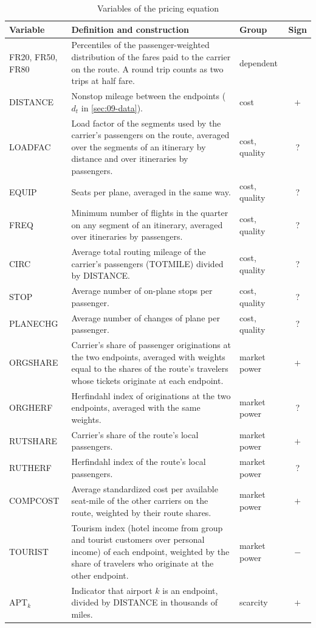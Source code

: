 \begin{table}[htbp]
\centering
\caption{Variables of the pricing equation}
\label{tab:09-bor-vars}
\footnotesize
\renewcommand{\arraystretch}{1.12}
\begin{tabularx}{\linewidth}{@{}l >{\raggedright\arraybackslash}X l c@{}}
\toprule
Variable & Definition and construction & Group & Sign \\
\midrule
FR20, FR50, FR80 & Percentiles of the passenger-weighted distribution of the fares paid to the carrier on the
route. A round trip counts as two trips at half fare. & dependent & \\
DISTANCE & Nonstop mileage between the endpoints ($d_t$ in \cref{sec:09-data}). & cost & $+$ \\
LOADFAC & Load factor of the segments used by the carrier's passengers on the route, averaged over the
segments of an itinerary by distance and over itineraries by passengers. & cost, quality & ? \\
EQUIP & Seats per plane, averaged in the same way. & cost, quality & ? \\
FREQ & Minimum number of flights in the quarter on any segment of an itinerary, averaged over itineraries by
passengers. & cost, quality & ? \\
CIRC & Average total routing mileage of the carrier's passengers (TOTMILE) divided by DISTANCE. & cost, quality
& ? \\
STOP & Average number of on-plane stops per passenger. & cost, quality & ? \\
PLANECHG & Average number of changes of plane per passenger. & cost, quality & ? \\
ORGSHARE & Carrier's share of passenger originations at the two endpoints, averaged with weights equal to the
shares of the route's travelers whose tickets originate at each endpoint. & market power & $+$ \\
ORGHERF & Herfindahl index of originations at the two endpoints, averaged with the same weights. & market power
& ? \\
RUTSHARE & Carrier's share of the route's local passengers. & market power & $+$ \\
RUTHERF & Herfindahl index of the route's local passengers. & market power & ? \\
COMPCOST & Average standardized cost per available seat-mile of the other carriers on the route, weighted by
their route shares. & market power & $+$ \\
TOURIST & Tourism index (hotel income from group and tourist customers over personal income) of each endpoint,
weighted by the share of travelers who originate at the other endpoint. & market power & $-$ \\
APT$_k$ & Indicator that airport $k$ is an endpoint, divided by DISTANCE in thousands of miles. & scarcity &
$+$ \\
\bottomrule
\end{tabularx}


\end{table}
